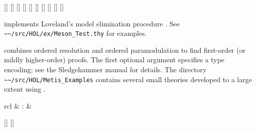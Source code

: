 \begin{isabellebody}
\begin{isamarkuptext}
  \begin{railoutput}
[]
\rail@bar
{}
[]
\rail@endbar
\rail@end
{}
[]
\rail@bar
{}
[]
\rail@bar
{}[]
[]
[]
[]
\rail@endbar
{}[]
\rail@endbar
\rail@bar
{}
[]
\rail@endbar
\rail@end
\end{railoutput}


  \begin{description}

  \item \hyperlink{method.HOL.meson}{\mbox{}} implements Loveland's model elimination
  procedure \cite{loveland-78}.  See \verb|~~/src/HOL/ex/Meson_Test.thy| for examples.

  \item \hyperlink{method.HOL.metis}{\mbox{}} combines ordered resolution and ordered
  paramodulation to find first-order (or mildly higher-order) proofs.
  The first optional argument specifies a type encoding; see the
  Sledgehammer manual \cite{isabelle-sledgehammer} for details.  The
  directory \verb|~~/src/HOL/Metis_Examples| contains several small
  theories developed to a large extent using \hyperlink{method.HOL.metis}{\mbox{}}.

  \end{description}%
\end{isamarkuptext}%
\isamarkuptrue%
%
\isamarkuptrue%
%
\begin{isamarkuptext}%
\begin{matharray}{rcl}
    \hypertarget{method.HOL.coherent}{\hyperlink{method.HOL.coherent}{\mbox{}}} & : &  \\
  \end{matharray}

  \begin{railoutput}
[]
\rail@bar
{}
[]
\rail@endbar
\rail@end
\end{railoutput}



\end{isamarkuptext}
\end{isabellebody}
